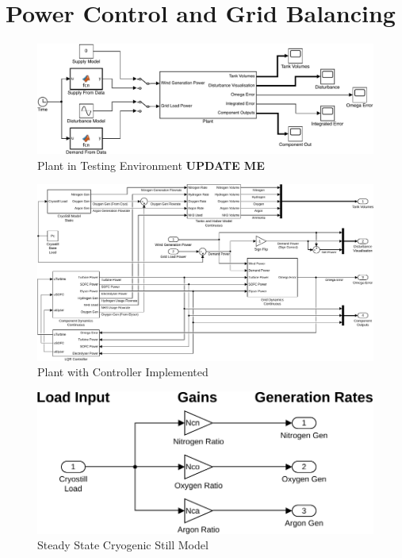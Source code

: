 \section{Power Control and Grid Balancing}




\begin{figure}[H]
\centering
        \includegraphics[scale=0.7]{images/plant/global.pdf}
        \caption{Plant in Testing Environment {\textbf{\color{red}UPDATE ME}}}
        \label{fig:global}
\end{figure}
\begin{figure}[H]
\centering
        \includegraphics[scale=0.6]{images/plant2/plant.pdf}
    \caption{Plant with Controller Implemented}
        \label{fig:plant}
\end{figure}
\begin{figure}[H]
\centering
        \includegraphics[scale=0.7]{images/plant2/cryo.pdf}
    \caption{Steady State Cryogenic Still Model}
        \label{fig:cryo}
\end{figure}
